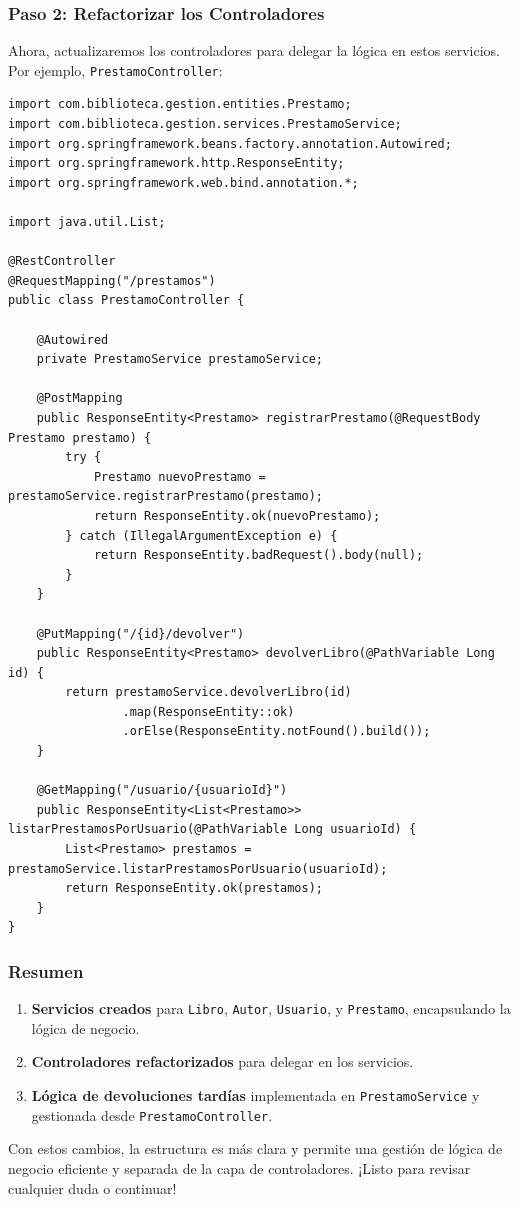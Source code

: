 \documentclass[11pt]{article}
\begin{document}
\subsubsection{Paso 2: Refactorizar los Controladores}
\label{sec:org4ff3eff}
Ahora, actualizaremos los controladores para delegar la lógica en estos
servicios. Por ejemplo, \texttt{PrestamoController}:

\begin{verbatim}
import com.biblioteca.gestion.entities.Prestamo;
import com.biblioteca.gestion.services.PrestamoService;
import org.springframework.beans.factory.annotation.Autowired;
import org.springframework.http.ResponseEntity;
import org.springframework.web.bind.annotation.*;

import java.util.List;

@RestController
@RequestMapping("/prestamos")
public class PrestamoController {

    @Autowired
    private PrestamoService prestamoService;

    @PostMapping
    public ResponseEntity<Prestamo> registrarPrestamo(@RequestBody Prestamo prestamo) {
        try {
            Prestamo nuevoPrestamo = prestamoService.registrarPrestamo(prestamo);
            return ResponseEntity.ok(nuevoPrestamo);
        } catch (IllegalArgumentException e) {
            return ResponseEntity.badRequest().body(null);
        }
    }

    @PutMapping("/{id}/devolver")
    public ResponseEntity<Prestamo> devolverLibro(@PathVariable Long id) {
        return prestamoService.devolverLibro(id)
                .map(ResponseEntity::ok)
                .orElse(ResponseEntity.notFound().build());
    }

    @GetMapping("/usuario/{usuarioId}")
    public ResponseEntity<List<Prestamo>> listarPrestamosPorUsuario(@PathVariable Long usuarioId) {
        List<Prestamo> prestamos = prestamoService.listarPrestamosPorUsuario(usuarioId);
        return ResponseEntity.ok(prestamos);
    }
}
\end{verbatim}

\subsubsection{Resumen}
\label{sec:org9d1db53}
\begin{enumerate}
\item \textbf{Servicios creados} para \texttt{Libro}, \texttt{Autor}, \texttt{Usuario}, y \texttt{Prestamo},
encapsulando la lógica de negocio.
\item \textbf{Controladores refactorizados} para delegar en los servicios.
\item \textbf{Lógica de devoluciones tardías} implementada en \texttt{PrestamoService} y
gestionada desde \texttt{PrestamoController}.
\end{enumerate}

Con estos cambios, la estructura es más clara y permite una gestión de
lógica de negocio eficiente y separada de la capa de controladores.
¡Listo para revisar cualquier duda o continuar!
\end{document}
